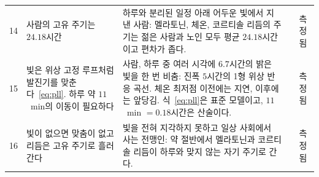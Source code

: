 {\begin{longtable}{>{\raggedright}p{0.5cm}>{\raggedright}p{4.0cm}>{\raggedright}p{5.6cm}>{\raggedright}p{2.3cm}>{\raggedright\arraybackslash}p{1.7cm}}
14 & 사람의 고유 주기는 $24.18$시간 & 하루와 분리된 일정 아래 어두운 빛에서 지낸 사람: 멜라토닌, 체온, 코르티솔 리듬의 주기는 젊은 사람과 노인 모두 평균 $24.18$시간이고 편차가 좁다. & \cite{Czeisler1999} & 측정됨 \\
15 & 빛은 위상 고정 루프처럼 발진기를 맞춘다~\eqref{eq:pll}. 하루 약 $11$~min의 이동이 필요하다 & 사람, 하루 중 여러 시각에 $6.7$시간의 밝은 빛을 한 번 비춤: 진폭 $5$시간의 1형 위상 반응 곡선. 체온 최저점 이전에는 지연, 이후에는 앞당김. 식~\eqref{eq:pll}은 표준 모델이고, $11$~min $=0.18$시간은 산술이다. & \cite{Khalsa2003prc} & 측정됨 \\
16 & 빛이 없으면 맞춤이 없고 리듬은 고유 주기로 흘러간다 & 빛을 전혀 지각하지 못하고 일상 사회에서 사는 전맹인: 약 절반에서 멜라토닌과 코르티솔 리듬이 하루와 맞지 않는 자기 주기로 간다. & \cite{Sack1992blind} & 측정됨 \\
\bottomrule
\end{longtable}}
